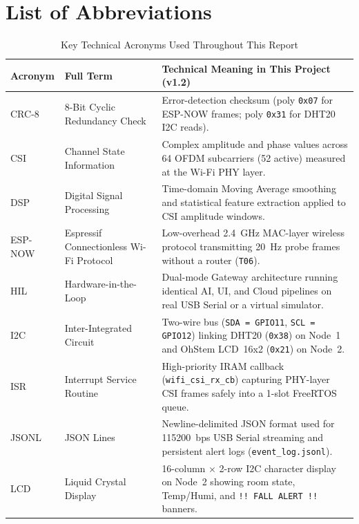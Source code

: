 \documentclass{hcmut-report}
\renewcommand{\arraystretch}{1.24}
\begin{document}
\newpage
\tableofcontents
\newpage

\section*{List of Abbreviations}
\vspace{-0.3cm}
\begin{table}[H]
\centering
\caption{Key Technical Acronyms Used Throughout This Report}
\label{tab:abbreviations}
\scriptsize
\renewcommand{\arraystretch}{0.98}
\begin{tabularx}{\textwidth}{|P{2.2cm}|P{4.7cm}|Y|}
\hline
\textbf{Acronym} & \textbf{Full Term} & \textbf{Technical Meaning in This Project (v1.2)} \\
\hline
CRC-8 & 8-Bit Cyclic Redundancy Check & Error-detection checksum (poly \texttt{0x07} for ESP-NOW frames; poly \texttt{0x31} for DHT20 I2C reads). \\
\hline
CSI & Channel State Information & Complex amplitude and phase values across 64 OFDM subcarriers (52 active) measured at the Wi-Fi PHY layer. \\
\hline
DSP & Digital Signal Processing & Time-domain Moving Average smoothing and statistical feature extraction applied to CSI amplitude windows. \\
\hline
ESP-NOW & Espressif Connectionless Wi-Fi Protocol & Low-overhead 2.4~GHz MAC-layer wireless protocol transmitting 20~Hz probe frames without a router (\texttt{T06}). \\
\hline
HIL & Hardware-in-the-Loop & Dual-mode Gateway architecture running identical AI, UI, and Cloud pipelines on real USB Serial or a virtual simulator. \\
\hline
I2C & Inter-Integrated Circuit & Two-wire bus (\texttt{SDA = GPIO11}, \texttt{SCL = GPIO12}) linking DHT20 (\texttt{0x38}) on Node~1 and OhStem LCD~16x2 (\texttt{0x21}) on Node~2. \\
\hline
ISR & Interrupt Service Routine & High-priority IRAM callback (\texttt{wifi\_csi\_rx\_cb}) capturing PHY-layer CSI frames safely into a 1-slot FreeRTOS queue. \\
\hline
JSONL & JSON Lines & Newline-delimited JSON format used for 115200~bps USB Serial streaming and persistent alert logs (\texttt{event\_log.jsonl}). \\
\hline
LCD & Liquid Crystal Display & 16-column $\times$ 2-row I2C character display on Node~2 showing room state, Temp/Humi, and \texttt{!! FALL ALERT !!} banners. \\

\end{tabularx}
\end{table}
\end{document}
